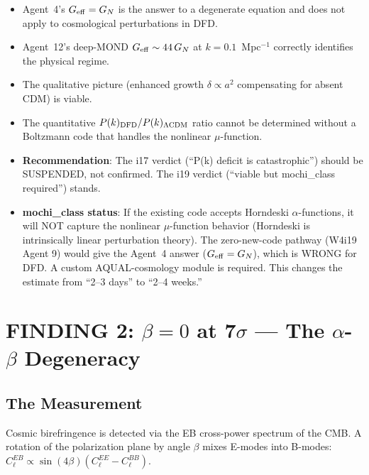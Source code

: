 \documentclass[11pt]{article}
\newcommand{\Geff}{G_{\rm eff}}
\newcommand{\GN}{G_N}
\begin{document}
\begin{tcolorbox}[colback=yellow!5!white, colframe=yellow!70!black,
  title=\textbf{VERDICT: Agent 12 Wins on Physics, But Quantitative Resolution
  Requires mochi\_class}]
\begin{itemize}
\item Agent~4's $\Geff = \GN$ is the answer to a degenerate equation and
  does not apply to cosmological perturbations in DFD.
\item Agent~12's deep-MOND $\Geff \sim 44\,\GN$ at $k = 0.1$~Mpc$^{-1}$
  correctly identifies the physical regime.
\item The qualitative picture (enhanced growth $\delta \propto a^2$
  compensating for absent CDM) is viable.
\item The quantitative $P(k)_{\rm DFD}/P(k)_{\Lambda\rm CDM}$ ratio
  cannot be determined without a Boltzmann code that handles the nonlinear
  $\mu$-function.
\item \textbf{Recommendation}: The i17 verdict (``P(k) deficit is
  catastrophic'') should be SUSPENDED, not confirmed. The i19 verdict
  (``viable but mochi\_class required'') stands.
\item \textbf{mochi\_class status}: If the existing code accepts
  Horndeski $\alpha$-functions, it will NOT capture the nonlinear
  $\mu$-function behavior (Horndeski is intrinsically linear perturbation
  theory). The zero-new-code pathway (W4i19 Agent 9) would give the
  Agent~4 answer ($\Geff = \GN$), which is WRONG for DFD. A custom
  AQUAL-cosmology module is required. This changes the estimate from
  ``2--3 days'' to ``2--4 weeks.''
\end{itemize}
\end{tcolorbox}


\section{FINDING 2: $\beta = 0$ at 7$\sigma$ --- The $\alpha$-$\beta$
Degeneracy}
\label{sec:beta}

\subsection{The Measurement}

Cosmic birefringence is detected via the EB cross-power spectrum of the CMB.
A rotation of the polarization plane by angle $\beta$ mixes E-modes into
B-modes: $C_\ell^{EB} \propto \sin(4\beta)(C_\ell^{EE} - C_\ell^{BB})$.
\end{document}
